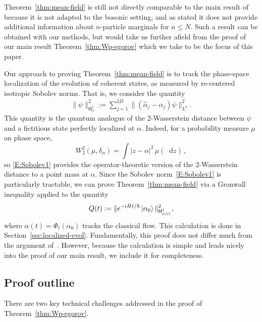 \documentclass[11pt]{amsart}
\def\Sobolev{{\mathsf{H}}}
\newcommand{\diff}{\mathop{}\!\mathrm{d}}
\def\ket#1{\mathinner{|{#1}\rangle}}
\numberwithin{equation}{section}
\begin{document}
Theorem~\ref{thm:mean-field} is still not directly comparable to the main result of~\cite{GP2017} because it is not
adapted to the bosonic setting, and as stated it does not provide additional information about $n$-particle
marginals for $n\leq N$.  Such a result can be obtained with our methods, but would take us further afield from the proof of our main result Theorem~\ref{thm:Wp-egorov} which we take to be the focus of this paper.

Our approach to proving Theorem~\ref{thm:mean-field} is to track the phase-space localization of the evolution of
coherent states, as measured by re-centered isotropic Sobolev norms.  That is, we consider the quantity
\begin{align}
\label{E:Sobolev1}
\|\psi\|_{\Sobolev^1_\alpha}^2 := \sum_{j=1}^{2D} \|(\hat{\alpha}_j - \alpha_j) \psi\|_{L^2}^2.
\end{align}
This quantity is the quantum analogue of the 2-Wasserstein distance between $\psi$ and a fictitious state perfectly localized at $\alpha$. Indeed, for a probability measure $\mu$ on phase space,
\[
W_2^2(\mu,\delta_\alpha)=\int |z-\alpha|^2\,\mu(\diff z)\,,
\]
so \eqref{E:Sobolev1} provides the operator-theoretic version of the 2-Wasserstein distance to a point mass at $\alpha$.  Since the Sobolev norm~\eqref{E:Sobolev1} is particularly tractable, we can prove Theorem~\ref{thm:mean-field} via a Gronwall inequality applied to the quantity
\[
Q(t) := \|e^{-i\hat{H}t/\hbar} \ket{\alpha_0} \|_{\Sobolev^1_{\alpha(t)}}^2,
\]
where $\alpha(t) =\Phi_t(\alpha_0)$ tracks the classical flow.  This calculation is done in
Section~\ref{sec:localized-evol}.  Fundamentally, this proof does not differ much from the argument of~\cite{GP2017}.
However, because the calculation is simple and leads nicely into the proof of our main result, we include it
for completeness.

\subsection{Proof outline}
\label{sec:outline}
There are two key technical challenges addressed in the proof of Theorem~\ref{thm:Wp-egorov}.
\end{document}
